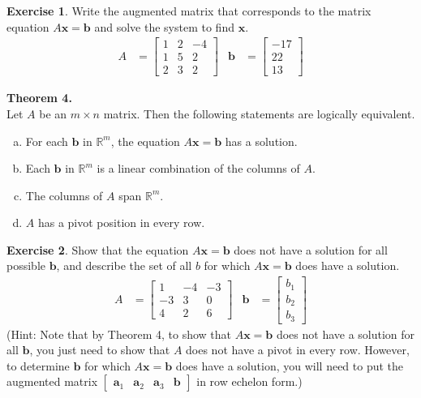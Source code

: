 \documentclass[10pt]{book}
\newcommand{\boxcolor}{gray!30}
\newenvironment{boxthm}{\begin{mdframed}[backgroundcolor=\boxcolor,nobreak=true]}{\end{mdframed}}
\theoremstyle{definition}
\newtheorem{exercise}{Exercise}[section]
\newcommand{\R}{\mathbb{R}}
\newcommand{\vect}[1]{\ensuremath{\boldsymbol{\mathbf{#1}}}}
\begin{document}
\begin{exercise} %
	Write the augmented matrix that corresponds to the matrix equation $A\vect{x}=\vect{b}$ and solve the system to find $\vect{x}$.
	\begin{align*}
	A &= \begin{bmatrix}1&2&-4\\1&5&2\\2&3&2\end{bmatrix} &
	\vect{b} &= \begin{bmatrix}-17\\22\\13\end{bmatrix}
	\end{align*}
\end{exercise}
\vfill


\newpage


\begin{boxthm}
	\textbf{Theorem 4.} \\
	Let $A$ be an $m\times n$ matrix. Then the following statements are logically equivalent.
	\begin{enumerate}[(a)]\itemsep0em 
		\item For each $\vect{b}$ in $\R^m$, the equation $A\vect{x}=\vect{b}$ has a solution.
		\item Each $\vect{b}$ in $\R^m$ is a linear combination of the columns of $A$.
		\item The columns of $A$ span $\R^m$.
		\item $A$ has a pivot position in every row.
	\end{enumerate}
\end{boxthm}

\begin{exercise} %
	Show that the equation $A\vect{x}=\vect{b}$ does not have a solution for all possible $\vect{b}$, and describe the set of all $b$ for which $A\vect{x}=\vect{b}$ does have a solution.
	\begin{align*}
	A &= \begin{bmatrix}1&-4&-3\\-3&3&0\\4&2&6\end{bmatrix} &
	\vect{b} &= \begin{bmatrix}b_1\\b_2\\b_3\end{bmatrix}
	\end{align*}
	(Hint: Note that by Theorem 4, to show that $A\vect{x}=\vect{b}$ does not have a solution for all $\vect{b}$, you just need to show that $A$ does not have a pivot in every row. However, to determine $\vect{b}$ for which $A\vect{x}=\vect{b}$ does have a solution, you will need to put the augmented matrix $\begin{bmatrix}\vect{a}_1&\vect{a}_2&\vect{a}_3&\vect{b}\end{bmatrix}$ in row echelon form.)
\end{exercise}
\vfill
\end{document}
